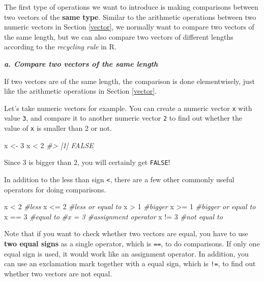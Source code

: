 \documentclass[
]{book}
\newenvironment{Shaded}{\begin{snugshade}}{\end{snugshade}}
\newcommand{\CommentTok}[1]{\textcolor[rgb]{0.56,0.35,0.01}{\textit{#1}}}
\newcommand{\DecValTok}[1]{\textcolor[rgb]{0.00,0.00,0.81}{#1}}
\newcommand{\NormalTok}[1]{#1}
\newcommand{\OtherTok}[1]{\textcolor[rgb]{0.56,0.35,0.01}{#1}}
\newcommand{\SpecialCharTok}[1]{\textcolor[rgb]{0.00,0.00,0.00}{#1}}
\begin{document}
The first type of operations we want to introduce is making comparisons between two vectors of the \textbf{same type}. Similar to the arithmetic operations between two numeric vectors in Section \ref{vector}, we normally want to compare two vectors of the same length, but we can also compare two vectors of different lengths according to the \emph{recycling rule} in R.

\textbf{\emph{a. Compare two vectors of the same length}}

If two vectors are of the same length, the comparison is done elementwisely, just like the arithmetic operations in Section \ref{vector}.

Let's take numeric vectors for example. You can create a numeric vector \texttt{x} with value \texttt{3}, and compare it to another numeric vector \texttt{2} to find out whether the value of \texttt{x} is smaller than 2 or not.

\begin{Shaded}
\begin{Highlighting}[]
\NormalTok{x }\OtherTok{\textless{}{-}} \DecValTok{3}
\NormalTok{x }\SpecialCharTok{\textless{}} \DecValTok{2}
\CommentTok{\#\textgreater{} [1] FALSE}
\end{Highlighting}
\end{Shaded}

Since 3 is bigger than 2, you will certainly get \texttt{FALSE}!

In addition to the less than sign \texttt{\textless{}}, there are a few other commonly useful operators for doing comparisons.

\begin{Shaded}
\begin{Highlighting}[]
\NormalTok{x }\SpecialCharTok{\textless{}} \DecValTok{2}      \CommentTok{\#less}
\NormalTok{x }\SpecialCharTok{\textless{}=} \DecValTok{2}     \CommentTok{\#less or equal to}
\NormalTok{x }\SpecialCharTok{\textgreater{}} \DecValTok{1}      \CommentTok{\#bigger}
\NormalTok{x }\SpecialCharTok{\textgreater{}=} \DecValTok{1}     \CommentTok{\#bigger or equal to}
\NormalTok{x }\SpecialCharTok{==} \DecValTok{3}     \CommentTok{\#equal to}
\CommentTok{\#x = 3     \#assignment operator}
\NormalTok{x }\SpecialCharTok{!=} \DecValTok{3}     \CommentTok{\#not equal to}
\end{Highlighting}
\end{Shaded}

Note that if you want to check whether two vectors are equal, you have to use \textbf{two equal signs} as a single operator, which is \texttt{==}, to do comparisons. If only one equal sign is used, it would work like an assignment operator. In addition, you can use an exclamation mark together with a equal sign, which is \texttt{!=}, to find out whether two vectors are not equal.
\end{document}
